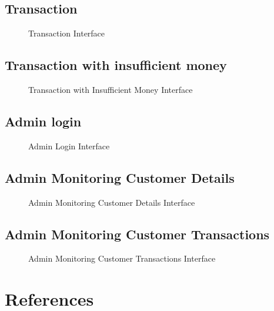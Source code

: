 \documentclass[12pt,a4paper]{report}
\begin{document}
\section{Transaction}
\begin{figure}[h]
    \centering
    \caption{Transaction Interface}
\end{figure}

\section{Transaction with insufficient money}
\begin{figure}[h]
    \centering
    \caption{Transaction with Insufficient Money Interface}
\end{figure}

\section{Admin login}
\begin{figure}[h]
    \centering
    \caption{Admin Login Interface}
\end{figure}

\section{Admin Monitoring Customer Details}
\begin{figure}[h]
    \centering
    \caption{Admin Monitoring Customer Details Interface}
\end{figure}

\section{Admin Monitoring Customer Transactions}
\begin{figure}[h]
    \centering
    \caption{Admin Monitoring Customer Transactions Interface}
\end{figure}

\chapter{References}
\end{document}
